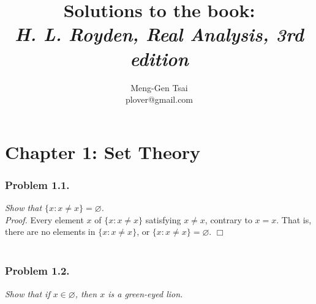 \documentclass{article}
\title{\textbf{Solutions to the book: \\ \emph{H. L. Royden, Real Analysis, 3rd edition}}}
\author{Meng-Gen Tsai \\ plover@gmail.com}
\begin{document}
\maketitle
\tableofcontents












\newpage
\section*{Chapter 1: Set Theory \\}



\subsubsection*{Problem 1.1.}
\emph{Show that $\{ x : x \neq x \} = \varnothing$.} \\

\emph{Proof.}
Every element $x$ of $\{ x : x \neq x \}$ satisfying $x \neq x$,
contrary to $x = x$. That is, there are no elements in $\{ x : x \neq x \}$,
or $\{ x : x \neq x \} = \varnothing$.
$\Box$ \\\\






\subsubsection*{Problem 1.2.}
\emph{Show that if $x \in \varnothing$, then $x$ is a green-eyed lion.} \\
\end{document}
